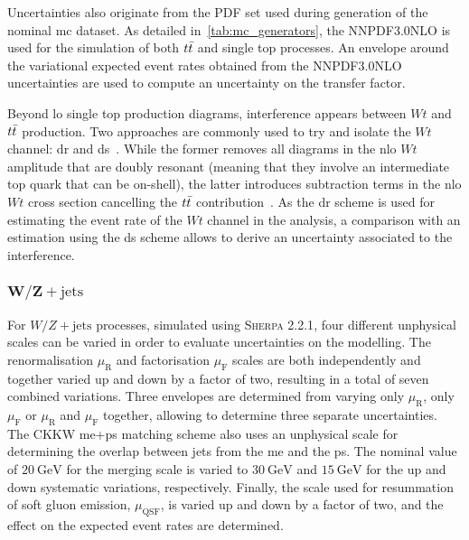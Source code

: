  Uncertainties also originate from the \gls{PDF} set used during generation of the nominal \gls{mc} dataset. As detailed in~\cref{tab:mc_generators}, the \textsc{NNPDF3.0NLO} is used for the simulation of both $t\bar{t}$ and single top processes. An envelope around the variational expected event rates obtained from the \textsc{NNPDF3.0NLO} uncertainties are used to compute an uncertainty on the transfer factor.
 
 Beyond \gls{lo} single top production diagrams, interference appears between $Wt$ and $t\bar{t}$ production. Two approaches are commonly used to try and isolate the $Wt$ channel: \gls{dr} and \gls{ds}~\cite{Frixione:2008yi}. While the former removes all diagrams in the \gls{nlo} $Wt$ amplitude that are doubly resonant (meaning that they involve an intermediate top quark that can be on-shell), the latter introduces subtraction terms in the \gls{nlo} $Wt$ cross section cancelling the $t\bar{t}$ contribution~\cite{Frixione:2008yi}. As the \gls{dr} scheme is used for estimating the event rate of the $Wt$ channel in the analysis, a comparison with an estimation using the \gls{ds} scheme allows to derive an uncertainty associated to the interference.
  
 \subsubsection{$\boldsymbol{W/Z+\mathrm{jets}}$}
 
 For $W/Z+\mathrm{jets}$ processes, simulated using \textsc{Sherpa 2.2.1}, four different unphysical scales can be varied in order to evaluate uncertainties on the modelling. The renormalisation $\mu_\mathrm{R}$ and factorisation $\mu_\mathrm{F}$ scales are both independently and together varied up and down by a factor of two, resulting in a total of seven combined variations. Three envelopes are determined from varying only $\mu_\mathrm{R}$, only $\mu_\mathrm{F}$ or $\mu_\mathrm{R}$ and $\mu_\mathrm{F}$ together, allowing to determine three separate uncertainties. The CKKW \gls{me}+\gls{ps} matching scheme also uses an unphysical scale for determining the overlap between jets from the \gls{me} and the \gls{ps}. The nominal value of $\SI{20}{\GeV}$ for the merging scale is varied to $\SI{30}{\GeV}$ and $\SI{15}{\GeV}$ for the up and down systematic variations, respectively. Finally, the scale used for resummation of soft gluon emission, $\mu_\mathrm{QSF}$, is varied up and down by a factor of two, and the effect on the expected event rates are determined.
 
